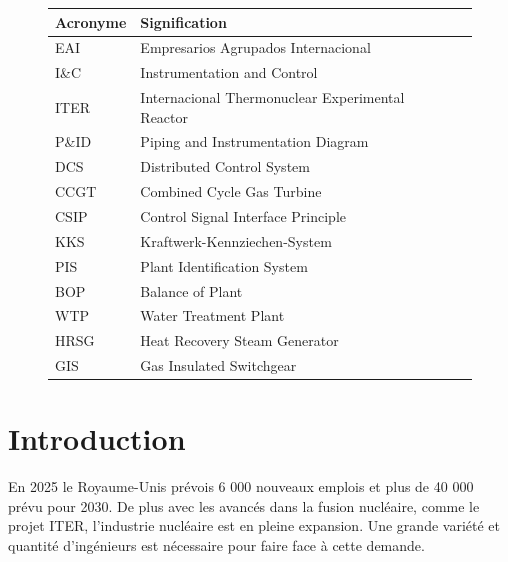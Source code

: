 \documentclass[11pt, openright]{book}
\begin{document}
\vspace{6cm}
\begin{figure}[ht!]


    \begin{tabular}{|l|l|l|}
        \hline
        Acronyme & Signification                                    \\
        \hline
        EAI      & Empresarios Agrupados Internacional              \\
        \hline
        I\&C     & Instrumentation and Control                      \\
        \hline
        ITER     & Internacional Thermonuclear Experimental Reactor \\
        \hline
        P\&ID    & Piping and Instrumentation Diagram               \\
        \hline
        DCS      & Distributed Control System                       \\
        \hline
        CCGT     & Combined Cycle Gas Turbine                       \\
        \hline
        CSIP     & Control Signal Interface Principle               \\
        \hline
        KKS      & Kraftwerk-Kennziechen-System                     \\
        \hline
        PIS      & Plant Identification System                      \\
        \hline
        BOP      & Balance of Plant                                 \\
        \hline
        WTP      & Water Treatment Plant                            \\
        \hline
        HRSG     & Heat Recovery Steam Generator                    \\
        \hline
        GIS      & Gas Insulated Switchgear                         \\
        \hline
    \end{tabular}

\end{figure}



\newpage
\section{Introduction}

En 2025 le Royaume-Unis prévois 6 000 nouveaux emplois et plus de 40 000 prévu pour 2030\cite{RR jobs}. De plus avec les avancés dans la fusion nucléaire, comme le projet ITER, l'industrie nucléaire est en pleine expansion. Une grande variété et quantité d'ingénieurs est nécessaire pour faire face à cette demande.
\end{document}
